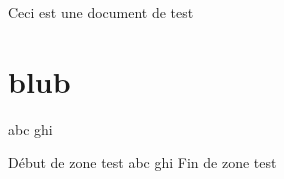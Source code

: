 \documentclass{article}
\newenvironment{test}{Début de zone test}{Fin de zone test}
\begin{document}
Ceci est une document de test

\section{blub}

\begin{myTestTCB}
abc %
ghi
\end{myTestTCB}

\begin{test}
abc %
ghi
\end{test}
\end{document}
